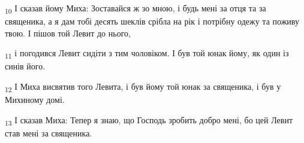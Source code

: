\begin{tcolorbox}
\textsubscript{10} І сказав йому Миха: Зоставайся ж зо мною, і будь мені за отця та за священика, а я дам тобі десять шеклів срібла на рік і потрібну одежу та поживу твою. І пішов той Левит до нього,
\end{tcolorbox}
\begin{tcolorbox}
\textsubscript{11} і погодився Левит сидіти з тим чоловіком. І був той юнак йому, як один із синів його.
\end{tcolorbox}
\begin{tcolorbox}
\textsubscript{12} І Миха висвятив того Левита, і був йому той юнак за священика, і був у Михиному домі.
\end{tcolorbox}
\begin{tcolorbox}
\textsubscript{13} І сказав Миха: Тепер я знаю, що Господь зробить добро мені, бо цей Левит став мені за священика.
\end{tcolorbox}
